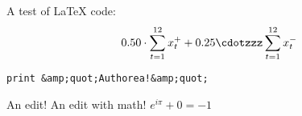 A test of LaTeX code: \[ 0.50 \cdot \sum_{t = 1}^{12} x_t^+ + 0.25 \cdotzzz \sum_{t = 1}^{12} x_t^- \]

\verb|print &amp;quot;Authorea!&amp;quot;|

An edit! An edit with math! $e^{i\pi} + 0 = -1$



